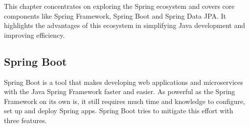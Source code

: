 \Author{\daAuthorThree}
    This chapter concentrates on exploring the Spring ecosystem and covers core components like Spring Framework, Spring Boot and Spring Data JPA. It highlights the advantages of this ecosystem in simplifying Java development and improving efficiency.

    \subsection{Spring Boot}
    Spring Boot is a tool that makes developing web applications and microservices with the Java Spring Framework faster and easier. As powerful as the Spring Framework on its own is, it still requires much time and knowledge to configure, set up and deploy Spring apps. Spring Boot tries to mitigate this effort with three features.

